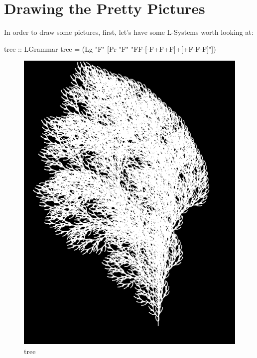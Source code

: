 \documentclass[]{article}
\makeatletter
\newenvironment{Shaded}{}{}
\newcommand{\DataTypeTok}[1]{\textcolor[rgb]{0.56,0.13,0.00}{{#1}}}
\newcommand{\StringTok}[1]{\textcolor[rgb]{0.25,0.44,0.63}{{#1}}}
\newcommand{\OtherTok}[1]{\textcolor[rgb]{0.00,0.44,0.13}{{#1}}}
\newcommand{\FunctionTok}[1]{\textcolor[rgb]{0.02,0.16,0.49}{{#1}}}
\newcommand{\NormalTok}[1]{{#1}}
\def\maxwidth{\ifdim\Gin@nat@width>\linewidth\linewidth
\else\Gin@nat@width\fi}
\let\Oldincludegraphics\includegraphics
\renewcommand{\includegraphics}[1]{\Oldincludegraphics[width=\maxwidth]{#1}}
\makeatother
\begin{document}
\section{Drawing the Pretty Pictures}

In order to draw some pictures, first, let's have some L-Systems worth
looking at:

\begin{Shaded}
\begin{Highlighting}[]
\OtherTok{tree ::} \DataTypeTok{LGrammar}
\NormalTok{tree  }\FunctionTok{=} \NormalTok{(}\DataTypeTok{Lg} \StringTok{"F"}
         \NormalTok{[}\DataTypeTok{Pr} \StringTok{"F"} \StringTok{"FF-[-F+F+F]+[+F-F-F]"}\NormalTok{])}
\end{Highlighting}
\end{Shaded}
\begin{figure}[htbp]
\centering
\includegraphics{tree.png}
\caption{tree}
\end{figure}
\end{document}

